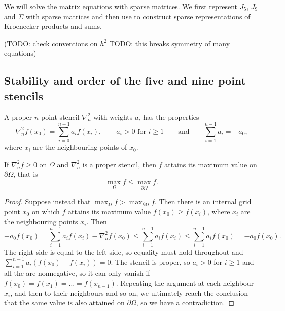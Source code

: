 We will solve the matrix equations with sparse matrices. \cite{scipy_sparse} 
We first represent $J_5$, $J_9$ and $\Sigma$ with sparse matrices and then use \cite{scipy_kron} to construct sparse representations of Kroenecker products and sums.

(TODO: check conventions on $h^2$ TODO: this breaks symmetry of many equations)

\newcommand{\inorm}[1]{
\lVert #1 \rVert_\infty
}

\subsection{Stability and order of the five and nine point stencils}
\begin{definition}
  A proper $n$-point stencil $\nabla_n^2$ with weights $a_i$ has the properties
  \begin{equation*}
  	\nabla_n^2 f(x_0) = \sum_{i=0}^{n-1} a_i f(x_i),
	\qquad 
	a_i > 0 \,\, \text{for} \,\, i \geq 1
	\qquad \text{and} \qquad
	\sum_{i=1}^{n-1} a_i = -a_0,
  \end{equation*}
  where $x_i$ are the neighbouring points of $x_0$.
\end{definition}

\begin{lemma}\label{pde:lemma:max}
If $\nabla_n^2 f \geq 0$ on $\Omega$ and $\nabla_n^2$ is a proper stencil, then $f$ attains its maximum value on $\partial \Omega$, that is
$$
\max_\Omega f  \leq \max_{\partial \Omega} f.
$$
\end{lemma}
\begin{proof}
Suppose instead that $\max_\Omega f > \max_{\partial \Omega} f$.
Then there is an internal grid point $x_0$ on which $f$ attains its maximum value $f(x_0) \geq f(x_i)$, where $x_i$ are the neighbouring points $x_i$.
Then
\begin{equation}
  -a_0 f(x_0)
  = \sum_{i=1}^{n-1} a_i f(x_i) - \nabla_n^2 f(x_0)
  \leq \sum_{i=1}^{n-1} a_i f(x_i)
  \leq \sum_{i=1}^{n-1} a_i f(x_0)
  = -a_0 f(x_0).
\end{equation}
The right side is equal to the left side, so equality must hold throughout and $\sum_{i=1}^{n-1} a_i (f(x_0) - f(x_i)) = 0$.
The stencil is proper, so $a_i > 0$ for $i \geq 1$ and all the are nonnegative, so it can only vanish if $f(x_0) = f(x_1) = \dots = f(x_{n-1})$.
Repeating the argument at each neighbour $x_i$, and then to their neighbours and so on, we ultimately reach the conclusion that the same value is also attained on $\partial \Omega$, so we have a contradiction.
\end{proof}

